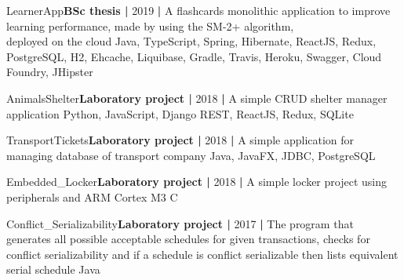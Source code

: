 

\begin{projects}
	\project
	{LearnerApp}{\textbf{BSc thesis |} 2019 \textbf{|}}
	{}
	{A flashcards monolithic application to improve learning performance, made by using the SM-2+ algorithm, \\ deployed on the cloud}
	{Java, TypeScript, Spring, Hibernate, ReactJS, Redux, PostgreSQL, H2, Ehcache, Liquibase, Gradle, Travis, Heroku, Swagger, Cloud Foundry, JHipster}
	
	\project
	{AnimalsShelter}{\textbf{Laboratory project |} 2018 \textbf{|}}
	{}
	{A simple CRUD shelter manager application}
	{Python, JavaScript, Django REST, ReactJS, Redux, SQLite}
	
	\project
	{TransportTickets}{\textbf{Laboratory project |} 2018 \textbf{|}}
	{}
	{A simple application for managing database of transport company}
	{Java, JavaFX, JDBC, PostgreSQL}
	
	\project
	{Embedded\_Locker}{\textbf{Laboratory project |} 2018 \textbf{|}}
	{}
	{A simple locker project using peripherals and ARM Cortex M3}
	{C}
	
	\project
	{Conflict\_Serializability}{\textbf{Laboratory project |} 2017 \textbf{|}}
	{}
	{The program that generates all possible acceptable schedules for given transactions, checks for conflict serializability and if a schedule is conflict serializable then lists equivalent serial schedule}
	{Java}
\end{projects}